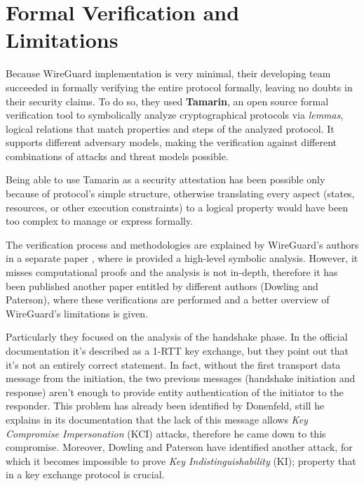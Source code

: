 \documentclass[light]{academica}
\begin{document}
\section{Formal Verification and Limitations}\label{sec:verlim}

Because WireGuard implementation is very minimal, their developing team succeeded in formally verifying the entire protocol formally, leaving no doubts in their security claims.
To do so, they used \textbf{Tamarin}, an open source formal verification tool to symbolically analyze cryptographical protocols via \textit{lemmas}, \ie logical relations that match properties and steps of the analyzed protocol.
It supports different adversary models, making the verification against different combinations of attacks and threat models possible.

Being able to use Tamarin as a security attestation has been possible only because of protocol's simple structure, otherwise translating every aspect (\eg states, resources, or other execution constraints) to a logical property would have been too complex to manage or express formally.

The verification process and methodologies are explained by WireGuard's authors in a separate paper \cite{wireguardverification}, where is provided a high-level symbolic analysis.
However, it misses computational proofs and the analysis is not in-depth, therefore it has been published another paper entitled  \cite{secanalysis} by different authors (Dowling and Paterson), where these verifications are performed and a better overview of WireGuard's limitations is given.

Particularly they focused on the analysis of the handshake phase.
In the official documentation it's described as a 1-RTT key exchange, but they point out that it's not an entirely correct statement.
In fact, without the first transport data message from the initiation, the two previous messages (handshake initiation and response) aren't enough to provide entity authentication of the initiator to the responder.
This problem has already been identified by Donenfeld, still he explains in its documentation that the lack of this message allows \textit{Key Compromise Impersonation} (KCI) attacks, therefore he came down to this compromise.
Moreover, Dowling and Paterson have identified another attack, for which it becomes impossible to prove \textit{Key Indistinguishability} (KI); property that in a key exchange protocol is crucial.
\end{document}
